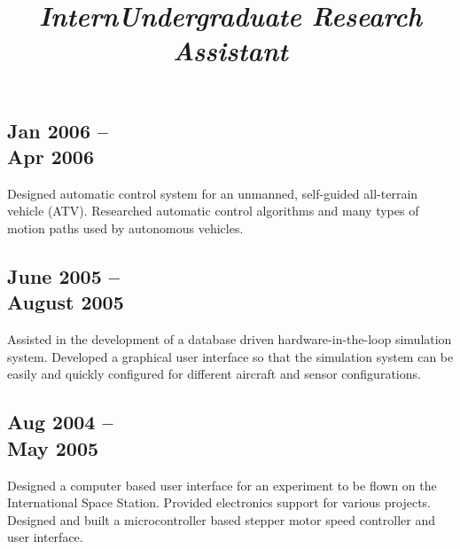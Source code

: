 \begin{resume}
\begin{position}
\section{\sc \small \hspace{8mm}Jan 2006 --\\\hspace{8mm}Apr 2006}
Designed automatic control system for an unmanned, self-guided all-terrain vehicle (ATV). Researched automatic control algorithms and many types of motion paths used by autonomous vehicles. 
\end{position}

%
%

\title{\em Intern}

\begin{position}
\vspace{-0.9cm}
\section{\sc \small \hspace{8mm}June 2005 -- \\\hspace{8mm}August 2005}
Assisted in the development of a database driven hardware-in-the-loop simulation system. Developed a graphical user interface so that the simulation system can be easily and quickly configured for different aircraft and sensor configurations.

\end{position}

\title{\em Undergraduate Research Assistant}
\dates{ }
\begin{position}
\vspace{-0.9cm}

\section{\sc \small \hspace{8mm}Aug 2004 -- \\\hspace{8mm}May 2005}
Designed a computer based user interface for an experiment to be flown on the International Space Station. Provided electronics support for various projects.  Designed and built a microcontroller based stepper motor speed controller and user interface. 


\end{position}
\end{resume}

